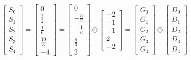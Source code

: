 \documentclass{article}%
\begin{document}
\[%
\left[\begin{matrix}S_{0}\\S_{1}\\S_{2}\\S_{3}\\S_{4}\end{matrix}\right] = \left[\begin{matrix}0\\\frac{3}{2}\\\frac{1}{6}\\\frac{10}{3}\\-4\end{matrix}\right] = \left[\begin{matrix}0\\- \frac{3}{2}\\- \frac{1}{6}\\\frac{5}{3}\\2\end{matrix}\right] \odot \left[\begin{matrix}-2\\-1\\-1\\2\\-2\end{matrix}\right] = \left[\begin{matrix}G_{0}\\G_{1}\\G_{2}\\G_{3}\\G_{4}\end{matrix}\right] \odot \left[\begin{matrix}D_{0}\\D_{1}\\D_{2}\\D_{3}\\D_{4}\end{matrix}\right]%
\]%
\end{document}
